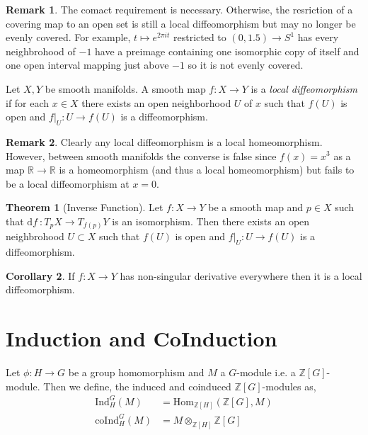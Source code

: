 \documentclass[12pt]{extarticle}
\newcommand{\Hom}[3]{\mathrm{Hom}_{#1}\left( #2, #3 \right)}
\newcommand{\Z}{\mathbb{Z}}
\newcommand{\R}{\mathbb{R}}
\renewcommand{\d}[1]{ \mathrm{d}#1 \:}
\theoremstyle{definition}
\newtheorem{theorem}{Theorem}[section]
\newtheorem{corollary}[theorem]{Corollary}
\newtheorem{remark}{Remark}
\newenvironment{definition}[1][Definition:]{\begin{trivlist}
\item[\hskip \labelsep {\bfseries #1}]}{\end{trivlist}}
\begin{document}
\begin{remark}
The comact requirement is necessary. Otherwise, the resriction of a covering map to an open set is still a local diffeomorphism but may no longer be evenly covered. For example, $t \mapsto e^{2 \pi i t}$ restricted to $(0, 1.5) \to S^1$ has every neighbrohood of $-1$ have a preimage containing one isomorphic copy of itself and one open interval mapping just above $-1$ so it is not evenly covered.
\end{remark}

\begin{definition}
Let $X, Y$ be smooth manifolds. A smooth map $f : X \to Y$ is a \textit{local diffeomorphism} if for each $x \in X$ there exists an open neighborhood $U$ of $x$ such that $f(U)$ is open and $f|_U : U \to f(U)$ is a diffeomorphism.
\end{definition}

\begin{remark}
Clearly any local diffeomorphism is a local homeomorphism. However, between smooth manifolds the converse is false since $f(x) = x^3$ as a map $\R \to \R$ is a homeomorphism (and thus a local homeomorphism) but fails to be a local diffeomorphism at $x = 0$. 
\end{remark}

\begin{theorem}[Inverse Function]
Let $f : X \to Y$ be a smooth map and $p \in X$ such that $\d{f} : T_p X \to T_{f(p)} Y$ is an isomorphism. Then there exists an open neighbrohood $U \subset X$ such that $f(U)$ is open and $f|_U : U \to f(U)$ is a diffeomorphism. 
\end{theorem}

\begin{corollary}
If $f : X \to Y$ has non-singular derivative everywhere then it is a local diffeomorphism.
\end{corollary}


\section{Induction and CoInduction}


\newcommand{\Gal}[1]{\mathrm{Gal}\left( #1 \right)}
\newcommand{\Nm}{\mathrm{Nm}}
\newcommand{\Ind}[3]{\mathrm{Ind}^{#1}_{#2} \left(#3\right)}
\newcommand{\coInd}[3]{\mathrm{coInd}^{#1}_{#2} \left(#3\right)}
\newcommand{\Res}[3]{\mathrm{Res}^{#1}_{#2} \left( #3 \right)}
\newcommand{\Mod}{\mathbf{Mod}}


\begin{definition}
Let $\phi : H \to G$ be a group homomorphism and $M$ a $G$-module i.e. a $\Z[G]$-module. Then we define, the induced and coinduced $\Z[G]$-modules as,
\begin{align*}
\Ind{G}{H}{M} & = \Hom{\Z[H]}{\Z[G]}{M}
\\
\coInd{G}{H}{M} & = M \otimes_{\Z[H]} \Z[G] 
\end{align*}
\end{definition}
\end{document}
